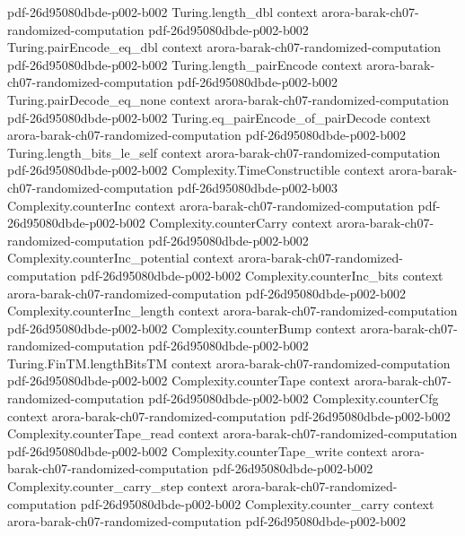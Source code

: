 \begin{theorem}
  {pdf-26d95080dbde-p002-b002}
\proofstep
  {Turing.length_dbl}
  {context}
  {arora-barak-ch07-randomized-computation}
  {pdf-26d95080dbde-p002-b002}
\proofstep
  {Turing.pairEncode_eq_dbl}
  {context}
  {arora-barak-ch07-randomized-computation}
  {pdf-26d95080dbde-p002-b002}
\proofstep
  {Turing.length_pairEncode}
  {context}
  {arora-barak-ch07-randomized-computation}
  {pdf-26d95080dbde-p002-b002}
\proofstep
  {Turing.pairDecode_eq_none}
  {context}
  {arora-barak-ch07-randomized-computation}
  {pdf-26d95080dbde-p002-b002}
\proofstep
  {Turing.eq_pairEncode_of_pairDecode}
  {context}
  {arora-barak-ch07-randomized-computation}
  {pdf-26d95080dbde-p002-b002}
\proofstep
  {Turing.length_bits_le_self}
  {context}
  {arora-barak-ch07-randomized-computation}
  {pdf-26d95080dbde-p002-b002}
\proofstep
  {Complexity.TimeConstructible}
  {context}
  {arora-barak-ch07-randomized-computation}
  {pdf-26d95080dbde-p002-b003}
\proofstep
  {Complexity.counterInc}
  {context}
  {arora-barak-ch07-randomized-computation}
  {pdf-26d95080dbde-p002-b002}
\proofstep
  {Complexity.counterCarry}
  {context}
  {arora-barak-ch07-randomized-computation}
  {pdf-26d95080dbde-p002-b002}
\proofstep
  {Complexity.counterInc_potential}
  {context}
  {arora-barak-ch07-randomized-computation}
  {pdf-26d95080dbde-p002-b002}
\proofstep
  {Complexity.counterInc_bits}
  {context}
  {arora-barak-ch07-randomized-computation}
  {pdf-26d95080dbde-p002-b002}
\proofstep
  {Complexity.counterInc_length}
  {context}
  {arora-barak-ch07-randomized-computation}
  {pdf-26d95080dbde-p002-b002}
\proofstep
  {Complexity.counterBump}
  {context}
  {arora-barak-ch07-randomized-computation}
  {pdf-26d95080dbde-p002-b002}
\proofstep
  {Turing.FinTM.lengthBitsTM}
  {context}
  {arora-barak-ch07-randomized-computation}
  {pdf-26d95080dbde-p002-b002}
\proofstep
  {Complexity.counterTape}
  {context}
  {arora-barak-ch07-randomized-computation}
  {pdf-26d95080dbde-p002-b002}
\proofstep
  {Complexity.counterCfg}
  {context}
  {arora-barak-ch07-randomized-computation}
  {pdf-26d95080dbde-p002-b002}
\proofstep
  {Complexity.counterTape_read}
  {context}
  {arora-barak-ch07-randomized-computation}
  {pdf-26d95080dbde-p002-b002}
\proofstep
  {Complexity.counterTape_write}
  {context}
  {arora-barak-ch07-randomized-computation}
  {pdf-26d95080dbde-p002-b002}
\proofstep
  {Complexity.counter_carry_step}
  {context}
  {arora-barak-ch07-randomized-computation}
  {pdf-26d95080dbde-p002-b002}
\proofstep
  {Complexity.counter_carry}
  {context}
  {arora-barak-ch07-randomized-computation}
  {pdf-26d95080dbde-p002-b002}
\proofstep

\end{theorem}
